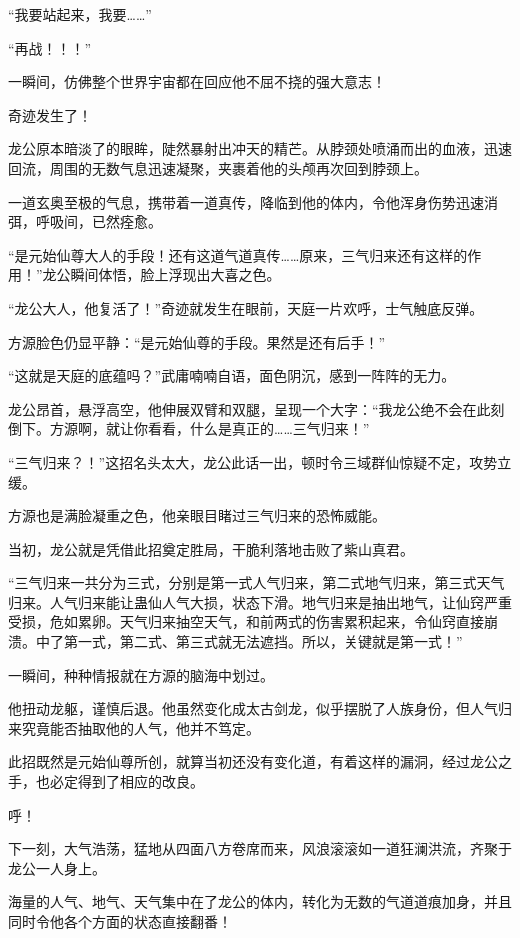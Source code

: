 \begin{this_body}
“我要站起来，我要……”

“再战！！！”

一瞬间，仿佛整个世界宇宙都在回应他不屈不挠的强大意志！

奇迹发生了！

龙公原本暗淡了的眼眸，陡然暴射出冲天的精芒。从脖颈处喷涌而出的血液，迅速回流，周围的无数气息迅速凝聚，夹裹着他的头颅再次回到脖颈上。

一道玄奥至极的气息，携带着一道真传，降临到他的体内，令他浑身伤势迅速消弭，呼吸间，已然痊愈。

“是元始仙尊大人的手段！还有这道气道真传……原来，三气归来还有这样的作用！”龙公瞬间体悟，脸上浮现出大喜之色。

“龙公大人，他复活了！”奇迹就发生在眼前，天庭一片欢呼，士气触底反弹。

方源脸色仍显平静：“是元始仙尊的手段。果然是还有后手！”

“这就是天庭的底蕴吗？”武庸喃喃自语，面色阴沉，感到一阵阵的无力。

龙公昂首，悬浮高空，他伸展双臂和双腿，呈现一个大字：“我龙公绝不会在此刻倒下。方源啊，就让你看看，什么是真正的……三气归来！”

“三气归来？！”这招名头太大，龙公此话一出，顿时令三域群仙惊疑不定，攻势立缓。

方源也是满脸凝重之色，他亲眼目睹过三气归来的恐怖威能。

当初，龙公就是凭借此招奠定胜局，干脆利落地击败了紫山真君。

“三气归来一共分为三式，分别是第一式人气归来，第二式地气归来，第三式天气归来。人气归来能让蛊仙人气大损，状态下滑。地气归来是抽出地气，让仙窍严重受损，危如累卵。天气归来抽空天气，和前两式的伤害累积起来，令仙窍直接崩溃。中了第一式，第二式、第三式就无法遮挡。所以，关键就是第一式！”

一瞬间，种种情报就在方源的脑海中划过。

他扭动龙躯，谨慎后退。他虽然变化成太古剑龙，似乎摆脱了人族身份，但人气归来究竟能否抽取他的人气，他并不笃定。

此招既然是元始仙尊所创，就算当初还没有变化道，有着这样的漏洞，经过龙公之手，也必定得到了相应的改良。

呼！

下一刻，大气浩荡，猛地从四面八方卷席而来，风浪滚滚如一道狂澜洪流，齐聚于龙公一人身上。

海量的人气、地气、天气集中在了龙公的体内，转化为无数的气道道痕加身，并且同时令他各个方面的状态直接翻番！


\end{this_body}
